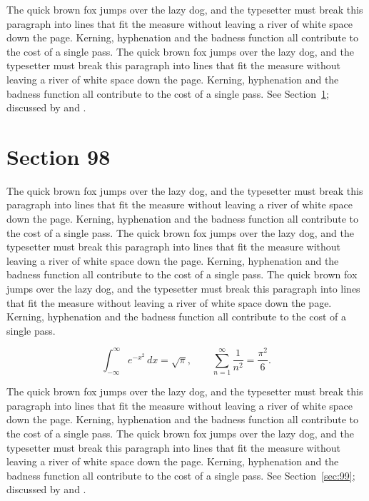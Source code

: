 \documentclass{article}
\begin{document}
The quick brown fox jumps over the lazy dog, and the typesetter must break this paragraph into lines that fit the measure without leaving a river of white space down the page. Kerning, hyphenation and the badness function all contribute to the cost of a single pass. The quick brown fox jumps over the lazy dog, and the typesetter must break this paragraph into lines that fit the measure without leaving a river of white space down the page. Kerning, hyphenation and the badness function all contribute to the cost of a single pass. 
See Section~\ref{sec:98}; discussed by \textcite{k3} and \textcite{l5}.
\section{Section 98}
\label{sec:98}
The quick brown fox jumps over the lazy dog, and the typesetter must break this paragraph into lines that fit the measure without leaving a river of white space down the page. Kerning, hyphenation and the badness function all contribute to the cost of a single pass. The quick brown fox jumps over the lazy dog, and the typesetter must break this paragraph into lines that fit the measure without leaving a river of white space down the page. Kerning, hyphenation and the badness function all contribute to the cost of a single pass. The quick brown fox jumps over the lazy dog, and the typesetter must break this paragraph into lines that fit the measure without leaving a river of white space down the page. Kerning, hyphenation and the badness function all contribute to the cost of a single pass. 

\begin{equation}\label{eq:98}
\int_{-\infty}^{\infty} e^{-x^{2}}\,dx = \sqrt{\pi}, \qquad
\sum_{n=1}^{\infty} \frac{1}{n^{2}} = \frac{\pi^{2}}{6}.
\end{equation}

The quick brown fox jumps over the lazy dog, and the typesetter must break this paragraph into lines that fit the measure without leaving a river of white space down the page. Kerning, hyphenation and the badness function all contribute to the cost of a single pass. The quick brown fox jumps over the lazy dog, and the typesetter must break this paragraph into lines that fit the measure without leaving a river of white space down the page. Kerning, hyphenation and the badness function all contribute to the cost of a single pass. 
See Section~\ref{sec:99}; discussed by \textcite{k4} and \textcite{l1}.
\end{document}
